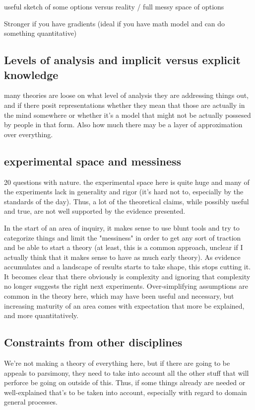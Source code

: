 \documentclass[]{article}
\begin{document}
useful sketch of some options versus reality / full messy space of options

Stronger if you have gradients (ideal if you have math model and can do something quantitative)

\subsection{ Levels of analysis and implicit versus explicit knowledge}
many theories are loose on what level of analysis they are addressing things out, and if there posit representations whether they mean that those are actually in the mind somewhere or whether it's a model that might not be actually possesed by people in that form. Also how much there may be a layer of approximation over everything. 

\subsection{experimental space and messiness}
20 	questions with nature. 
the experimental space here is quite huge and many of the experiments lack in generality and rigor (it's hard not to, especially by the standards of the day). Thus, a lot of the theoretical claims, while possibly useful and true, are not well supported by the evidence presented. 

In the start of an area of inquiry, it makes sense to use blunt tools and try to categorize things and limit the "messiness" in order to get any sort of traction and be able to start a theory (at least, this is a common approach, unclear if I actually think that it makes sense to have as much early theory). As evidence accumulates and a landscape of results starts to take shape, this stops cutting it. It becomes clear that there obviously is complexity and ignoring that complexity no longer suggests the right next experiments. Over-simplifying assumptions are common in the theory here, which may have been useful and necessary, but increasing maturity of an area comes with expectation that more be explained, and more quantitatively. 
\subsection{Constraints from other disciplines}
We're not making a theory of everything here, but if there are going to be appeals to parsimony, they need to take into account all the other stuff that will perforce be going on outside of this. Thus, if some things already are needed or well-explained that's to be  taken into account, especially with regard to domain general processes. 
\end{document}
